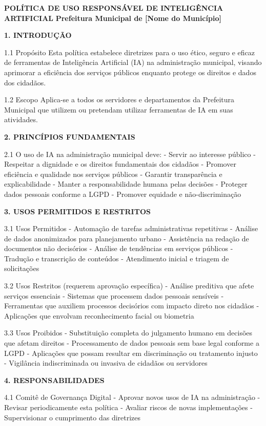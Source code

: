 \documentclass[12pt,a4paper]{book}
\begin{document}
\begin{tcolorbox}[exemplo]
\textbf{POLÍTICA DE USO RESPONSÁVEL DE INTELIGÊNCIA ARTIFICIAL}
\textbf{Prefeitura Municipal de [Nome do Município]}

\textbf{1. INTRODUÇÃO}

1.1 Propósito
Esta política estabelece diretrizes para o uso ético, seguro e eficaz de ferramentas de Inteligência Artificial (IA) na administração municipal, visando aprimorar a eficiência dos serviços públicos enquanto protege os direitos e dados dos cidadãos.

1.2 Escopo
Aplica-se a todos os servidores e departamentos da Prefeitura Municipal que utilizem ou pretendam utilizar ferramentas de IA em suas atividades.

\textbf{2. PRINCÍPIOS FUNDAMENTAIS}

2.1 O uso de IA na administração municipal deve:
- Servir ao interesse público
- Respeitar a dignidade e os direitos fundamentais dos cidadãos
- Promover eficiência e qualidade nos serviços públicos
- Garantir transparência e explicabilidade
- Manter a responsabilidade humana pelas decisões
- Proteger dados pessoais conforme a LGPD
- Promover equidade e não-discriminação

\textbf{3. USOS PERMITIDOS E RESTRITOS}

3.1 Usos Permitidos
- Automação de tarefas administrativas repetitivas
- Análise de dados anonimizados para planejamento urbano
- Assistência na redação de documentos não decisórios
- Análise de tendências em serviços públicos
- Tradução e transcrição de conteúdos
- Atendimento inicial e triagem de solicitações

3.2 Usos Restritos (requerem aprovação específica)
- Análise preditiva que afete serviços essenciais
- Sistemas que processem dados pessoais sensíveis
- Ferramentas que auxiliem processos decisórios com impacto direto nos cidadãos
- Aplicações que envolvam reconhecimento facial ou biometria

3.3 Usos Proibidos
- Substituição completa do julgamento humano em decisões que afetam direitos
- Processamento de dados pessoais sem base legal conforme a LGPD
- Aplicações que possam resultar em discriminação ou tratamento injusto
- Vigilância indiscriminada ou invasiva de cidadãos ou servidores

\textbf{4. RESPONSABILIDADES}

4.1 Comitê de Governança Digital
- Aprovar novos usos de IA na administração
- Revisar periodicamente esta política
- Avaliar riscos de novas implementações
- Supervisionar o cumprimento das diretrizes


\end{tcolorbox}
\end{document}
